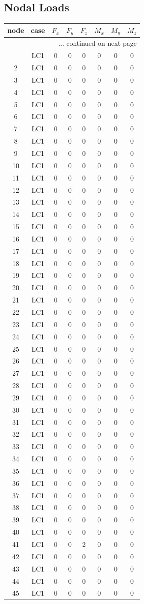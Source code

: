 \documentclass{article}%
\begin{document}
%
\subsection{Nodal Loads}%
\label{subsec:NodalLoads}%
\begin{longtable}{| c c | c c c c c c |}%
\hline%
node&case&$F_x$&$F_y$&$F_z$&$M_x$&$M_y$&$M_z$\\%
\hline%
\endhead%
\hline%
\multicolumn{8}{r}{... continued on next page}\\%
\endfoot%
\hline%
\endlastfoot%
1&LC1&0&0&0&0&0&0\\%
2&LC1&0&0&0&0&0&0\\%
3&LC1&0&0&0&0&0&0\\%
4&LC1&0&0&0&0&0&0\\%
5&LC1&0&0&0&0&0&0\\%
6&LC1&0&0&0&0&0&0\\%
7&LC1&0&0&0&0&0&0\\%
8&LC1&0&0&0&0&0&0\\%
9&LC1&0&0&0&0&0&0\\%
10&LC1&0&0&0&0&0&0\\%
11&LC1&0&0&0&0&0&0\\%
12&LC1&0&0&0&0&0&0\\%
13&LC1&0&0&0&0&0&0\\%
14&LC1&0&0&0&0&0&0\\%
15&LC1&0&0&0&0&0&0\\%
16&LC1&0&0&0&0&0&0\\%
17&LC1&0&0&0&0&0&0\\%
18&LC1&0&0&0&0&0&0\\%
19&LC1&0&0&0&0&0&0\\%
20&LC1&0&0&0&0&0&0\\%
21&LC1&0&0&0&0&0&0\\%
22&LC1&0&0&0&0&0&0\\%
23&LC1&0&0&0&0&0&0\\%
24&LC1&0&0&0&0&0&0\\%
25&LC1&0&0&0&0&0&0\\%
26&LC1&0&0&0&0&0&0\\%
27&LC1&0&0&0&0&0&0\\%
28&LC1&0&0&0&0&0&0\\%
29&LC1&0&0&0&0&0&0\\%
30&LC1&0&0&0&0&0&0\\%
31&LC1&0&0&0&0&0&0\\%
32&LC1&0&0&0&0&0&0\\%
33&LC1&0&0&0&0&0&0\\%
34&LC1&0&0&0&0&0&0\\%
35&LC1&0&0&0&0&0&0\\%
36&LC1&0&0&0&0&0&0\\%
37&LC1&0&0&0&0&0&0\\%
38&LC1&0&0&0&0&0&0\\%
39&LC1&0&0&0&0&0&0\\%
40&LC1&0&0&0&0&0&0\\%
41&LC1&0&0&2&0&0&0\\%
42&LC1&0&0&0&0&0&0\\%
43&LC1&0&0&0&0&0&0\\%
44&LC1&0&0&0&0&0&0\\%
45&LC1&0&0&0&0&0&0\\%
\end{longtable}%
\end{document}
